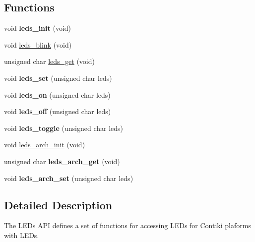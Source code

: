 \subsection*{Functions}
\begin{DoxyCompactItemize}
\item 
\hypertarget{group__leds_ga67cfc3137a465e560792490e81365254}{}void {\bfseries leds\+\_\+init} (void)\label{group__leds_ga67cfc3137a465e560792490e81365254}

\item 
void \hyperlink{group__leds_ga582dbf9799698c90393f6de79d3dca3e}{leds\+\_\+blink} (void)
\item 
unsigned char \hyperlink{group__leds_ga6a175ab2c16737aaf30b263ed8211bbd}{leds\+\_\+get} (void)
\item 
\hypertarget{group__leds_ga15c1b2d5b036a070ec7185c816b1c35e}{}void {\bfseries leds\+\_\+set} (unsigned char leds)\label{group__leds_ga15c1b2d5b036a070ec7185c816b1c35e}

\item 
\hypertarget{group__leds_ga8e49b78cf374b9bcdb6ae5704e25fb51}{}void {\bfseries leds\+\_\+on} (unsigned char leds)\label{group__leds_ga8e49b78cf374b9bcdb6ae5704e25fb51}

\item 
\hypertarget{group__leds_gaae6c560bca422fa8d89a57d4c779a246}{}void {\bfseries leds\+\_\+off} (unsigned char leds)\label{group__leds_gaae6c560bca422fa8d89a57d4c779a246}

\item 
\hypertarget{group__leds_gad9ef6d3924cf48998e5e85d480cc355b}{}void {\bfseries leds\+\_\+toggle} (unsigned char leds)\label{group__leds_gad9ef6d3924cf48998e5e85d480cc355b}

\item 
void \hyperlink{group__leds_gac287ce66ae3e3751c7c57de50b451ddb}{leds\+\_\+arch\+\_\+init} (void)
\item 
\hypertarget{group__leds_ga5001ce3a53c71d806ab4b4e8eea45d61}{}unsigned char {\bfseries leds\+\_\+arch\+\_\+get} (void)\label{group__leds_ga5001ce3a53c71d806ab4b4e8eea45d61}

\item 
\hypertarget{group__leds_ga01603ac6a925712857e7a50178fe695c}{}void {\bfseries leds\+\_\+arch\+\_\+set} (unsigned char leds)\label{group__leds_ga01603ac6a925712857e7a50178fe695c}

\end{DoxyCompactItemize}


\subsection{Detailed Description}
The L\+E\+Ds A\+P\+I defines a set of functions for accessing L\+E\+Ds for Contiki plaforms with L\+E\+Ds.


